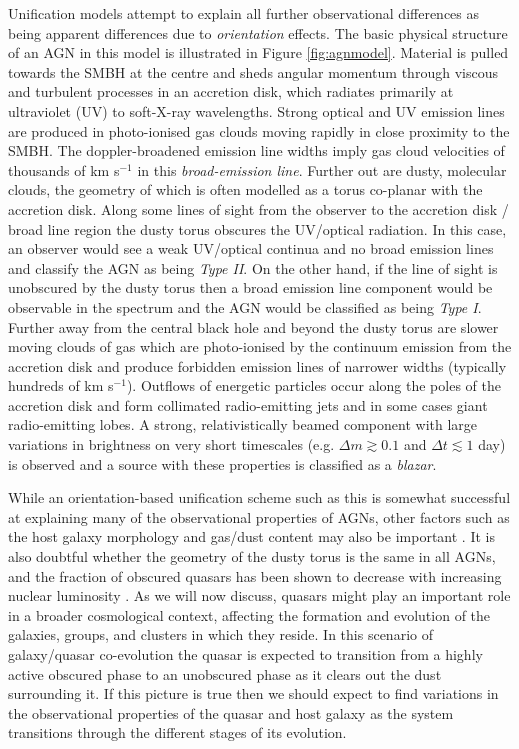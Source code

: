 Unification models attempt to explain all further observational differences as being apparent differences due to {\it orientation} effects. 
The basic physical structure of an AGN in this model is illustrated in Figure \ref{fig:agnmodel}. 
Material is pulled towards the SMBH at the centre and sheds angular momentum through viscous and turbulent processes in an accretion disk, which radiates primarily at ultraviolet (UV) to soft-X-ray wavelengths. 
Strong optical and UV emission lines are produced in photo-ionised gas clouds moving rapidly in close proximity to the SMBH. 
The doppler-broadened emission line widths imply gas cloud velocities of thousands of km s$^{-1}$ in this {\it broad-emission line}. 
Further out are dusty, molecular clouds, the geometry of which is often modelled as a torus co-planar with the accretion disk. 
Along some lines of sight from the observer to the accretion disk / broad line region the dusty torus obscures the UV/optical radiation. 
In this case, an observer would see a weak UV/optical continua and no broad emission lines and classify the AGN as being {\it Type II}. 
On the other hand, if the line of sight is unobscured by the dusty torus then a broad emission line component would be observable in the spectrum and the AGN would be classified as being {\it Type I}. 
Further away from the central black hole and beyond the dusty torus are slower moving clouds of gas which are photo-ionised by the continuum emission from the accretion disk and produce forbidden emission lines of narrower widths (typically hundreds of km s$^{-1}$). 
Outflows of energetic particles occur along the poles of the accretion disk and form collimated radio-emitting jets and in some cases giant radio-emitting lobes. 
A strong, relativistically beamed component with large variations in brightness on very short timescales (e.g. ${\Delta}m \gtrsim 0.1$ and $\Delta t \lesssim 1$ day) is observed and a source with these properties is classified as a {\it blazar}. 

While an orientation-based unification scheme such as this is somewhat successful at explaining many of the observational properties of AGNs, other factors such as the host galaxy morphology and gas/dust content may also be important \citep{peterson95}. 
It is also doubtful whether the geometry of the dusty torus is the same in all AGNs, and the fraction of obscured quasars has been shown to decrease with increasing nuclear luminosity \citep{lawrence91}. 
As we will now discuss, quasars might play an important role in a broader cosmological context, affecting the formation and evolution of the galaxies, groups, and clusters in which they reside. 
In this scenario of galaxy/quasar co-evolution the quasar is expected to transition from a highly active obscured phase to an unobscured phase as it clears out the dust surrounding it. 
If this picture is true then we should expect to find variations in the observational properties of the quasar and host galaxy as the system transitions through the different stages of its evolution.  

